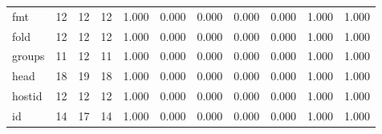 \begin{longtable}{lp{1.8cm}p{1.8cm}p{1.8cm}p{1.8cm}p{1.8cm}p{1.8cm}p{1.8cm}p{1.8cm}p{1.8cm}p{1.8cm}}
fmt       &                           12 &                 12 &                                12 &                                      1.000 &                                  0.000 &                                        0.000 &                             0.000 &                                   0.000 &                              1.000 &                                              1.000 \\
fold      &                           12 &                 12 &                                12 &                                      1.000 &                                  0.000 &                                        0.000 &                             0.000 &                                   0.000 &                              1.000 &                                              1.000 \\
groups    &                           11 &                 12 &                                11 &                                      1.000 &                                  0.000 &                                        0.000 &                             0.000 &                                   0.000 &                              1.000 &                                              1.000 \\
head      &                           18 &                 19 &                                18 &                                      1.000 &                                  0.000 &                                        0.000 &                             0.000 &                                   0.000 &                              1.000 &                                              1.000 \\
hostid    &                           12 &                 12 &                                12 &                                      1.000 &                                  0.000 &                                        0.000 &                             0.000 &                                   0.000 &                              1.000 &                                              1.000 \\
id        &                           14 &                 17 &                                14 &                                      1.000 &                                  0.000 &                                        0.000 &                             0.000 &                                   0.000 &                              1.000 &                                              1.000 \\

\end{longtable}
